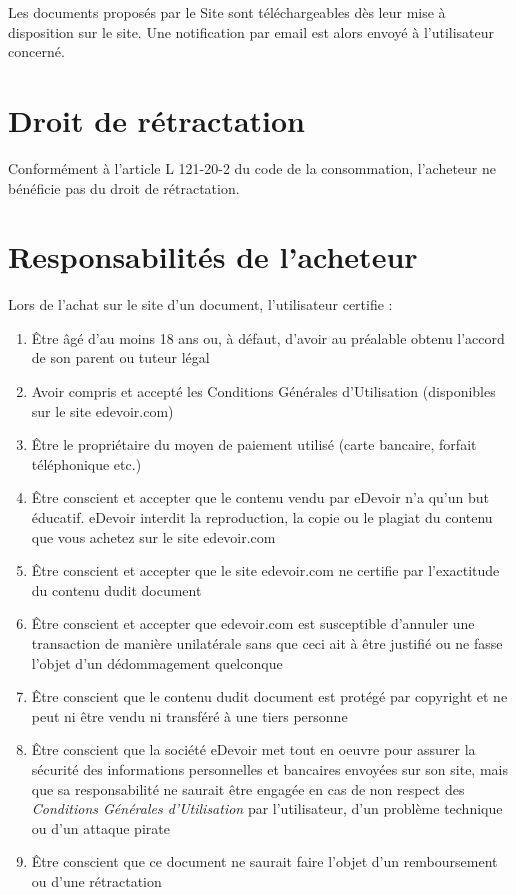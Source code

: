 Les documents proposés par le Site sont téléchargeables dès leur mise à disposition sur le site. Une notification par email est alors envoyé à l'utilisateur concerné.

\section{Droit de rétractation}

Conformément à l'article L 121-20-2 du code de la consommation, l'acheteur ne bénéficie pas du droit de rétractation. 

\section{Responsabilités de l'acheteur}

Lors de l'achat sur le site d'un document, l'utilisateur certifie :
\begin{enumerate}
   \item \^Etre âgé d'au moins 18 ans ou, à défaut, d'avoir au préalable obtenu l'accord de son parent ou tuteur légal
   \item Avoir compris et accepté les Conditions Générales d'Utilisation (disponibles sur le site edevoir.com)
   \item \^Etre le propriétaire du moyen de paiement utilisé (carte bancaire, forfait téléphonique etc.)
   \item \^Etre conscient et accepter que le contenu vendu par eDevoir n'a qu'un but éducatif. eDevoir interdit la reproduction, la copie ou le plagiat du contenu que vous achetez sur le site edevoir.com
   \item \^Etre conscient et accepter que le site edevoir.com ne certifie par l'exactitude du contenu dudit document
   \item \^Etre conscient et accepter que edevoir.com est susceptible d'annuler une transaction de manière unilatérale sans que ceci ait à être justifié ou ne fasse l'objet d'un dédommagement quelconque
   \item \^Etre conscient que le contenu dudit document est protégé par copyright et ne peut ni être vendu ni transféré à une tiers personne
   \item \^Etre conscient que la société eDevoir met tout en oeuvre pour assurer la sécurité des informations personnelles et bancaires envoyées sur son site, mais que sa responsabilité ne saurait être engagée en cas de non respect des \textit{Conditions Générales d'Utilisation} par l'utilisateur, d'un problème technique ou d'un attaque pirate
   \item \^Etre conscient que ce document ne saurait faire l'objet d'un remboursement ou d'une rétractation
\end{enumerate}